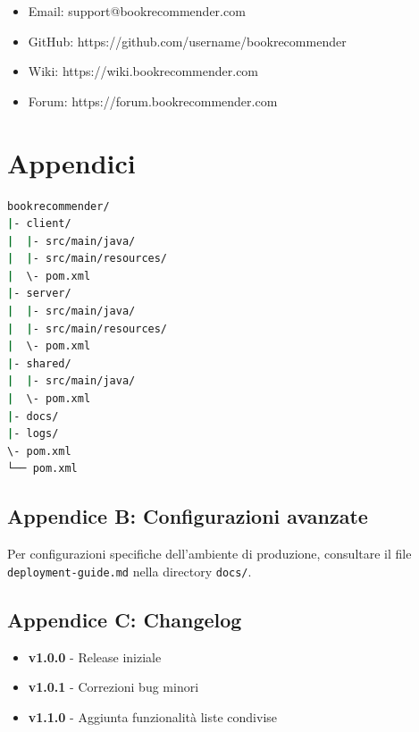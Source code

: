 \documentclass[12pt,a4paper]{article}
\begin{document}
\begin{itemize}
    \item Email: support@bookrecommender.com
    \item GitHub: https://github.com/username/bookrecommender
    \item Wiki: https://wiki.bookrecommender.com
    \item Forum: https://forum.bookrecommender.com
\end{itemize}

\section{Appendici}

\begin{lstlisting}[language=bash]
bookrecommender/
|- client/
|  |- src/main/java/
|  |- src/main/resources/
|  \- pom.xml
|- server/
|  |- src/main/java/
|  |- src/main/resources/
|  \- pom.xml
|- shared/
|  |- src/main/java/
|  \- pom.xml
|- docs/
|- logs/
\- pom.xml
└── pom.xml
\end{lstlisting}

\subsection{Appendice B: Configurazioni avanzate}

Per configurazioni specifiche dell'ambiente di produzione, consultare il file \texttt{deployment-guide.md} nella directory \texttt{docs/}.

\subsection{Appendice C: Changelog}

\begin{itemize}
    \item \textbf{v1.0.0} - Release iniziale
    \item \textbf{v1.0.1} - Correzioni bug minori
    \item \textbf{v1.1.0} - Aggiunta funzionalità liste condivise
\end{itemize}
\end{document}
